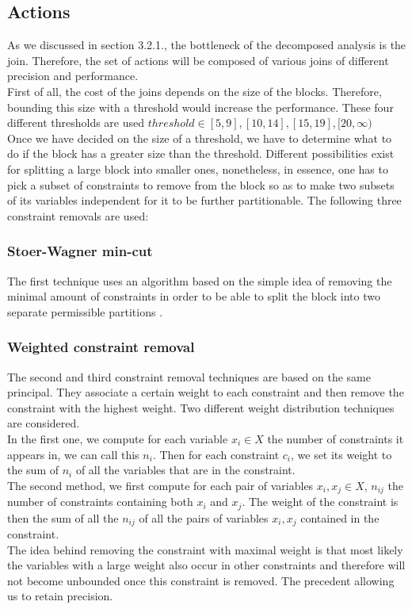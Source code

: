 \subsection{Actions}
As we discussed in section 3.2.1., the bottleneck of the decomposed analysis is the join. Therefore, the set of actions will be composed of various joins of different precision and performance.\\
First of all, the cost of the joins depends on the size of the blocks. Therefore, bounding this size with a threshold would increase the performance. These four different thresholds are used $threshold \in [5,9],[10,14],[15,19],[20,\infty)$\\
Once we have decided on the size of a threshold, we have to determine what to do if the block has a greater size than the threshold. Different possibilities exist for splitting a large block into smaller ones, nonetheless, in essence, one has to pick a subset of constraints to remove from the block so as to make two subsets of its variables independent for it to be further partitionable. The following three constraint removals are used:
\subsubsection{Stoer-Wagner min-cut}
The first technique uses an algorithm based on the simple idea of removing the minimal amount of constraints in order to be able to split the block into two separate permissible partitions \cite{stoer1997simple}.
\subsubsection{Weighted constraint removal}
The second and third constraint removal techniques are based on the same principal. They associate a certain weight to each constraint and then remove the constraint with the highest weight. Two different weight distribution techniques are considered. \\
In the first one, we compute for each variable $x_i \in X$ the number of constraints it appears in, we can call this $n_i$. Then for each constraint $c_i$, we set its weight to the sum of $n_i$ of all the variables that are in the constraint.\\
The second method, we first compute for each pair of variables $x_i,x_j\in X$, $n_{ij}$ the number of constraints containing both $x_i$ and $x_j$. The weight of the constraint is then the sum of all the $n_{ij}$ of all the pairs of variables $x_i,x_j$ contained in the constraint.\\
The idea behind removing the constraint with maximal weight is that most likely the variables with a large weight also occur in other constraints and therefore will not become unbounded once this constraint is removed. The precedent allowing us to retain precision.
